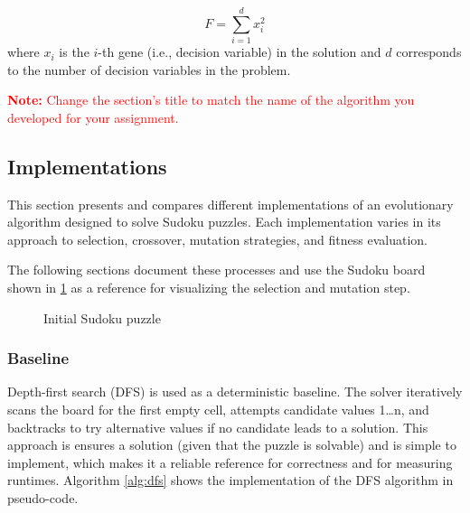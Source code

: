 \begin{equation}
    F = \sum_{i=1}^d x_i^2 
\end{equation}
where $x_i$ is the $i$-th gene (i.e., decision variable) in the solution and $d$ corresponds to the number of decision variables in the problem.

\textcolor{red}{\textbf{Note:} Change the section's title to match the name of the algorithm you developed for your assignment.}

\subsection{Implementations}
This section presents and compares different implementations of an evolutionary algorithm designed to solve Sudoku puzzles. Each implementation varies in its approach to selection, crossover, mutation strategies, and fitness evaluation.

The following sections document these processes and use the Sudoku board shown in \ref{fig:initial-sudoku} as a reference for visualizing the selection and mutation step.

\begin{figure}[H]
\centering
{}
\caption{Initial Sudoku puzzle}
\label{fig:initial-sudoku}
\end{figure}

\subsubsection{Baseline}
Depth-first search (DFS) is used as a deterministic baseline. The solver iteratively scans the board for the first empty cell, attempts candidate values 1\dots n, and backtracks to try alternative values if no candidate leads to a solution. This approach is ensures a solution (given that the puzzle is solvable) and is simple to implement, which makes it a reliable reference for correctness and for measuring runtimes.
Algorithm \ref{alg:dfs} shows the implementation of the DFS algorithm in pseudo-code.

